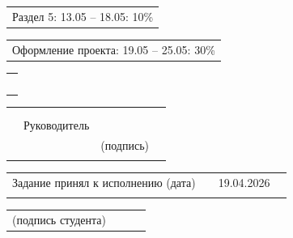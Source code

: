 \documentclass[12pt, А4, twoside]{article}
\begin{document}
\begin{FlushLeft}
    \vspace{-0.1 cm}
    
    \begin{tabular}{p{17.25cm}}
    	\hspace{0.3cm} \textsf{Раздел 5:} \hspace{2.54cm} \textsf{13.05 {--} 18.05:} \hspace{0.5cm} \textsf{10\%} \vspace{0pt} \hline
    \end{tabular}
    
    \vspace{-0.1 cm}
    
    \begin{tabular}{p{17.25cm}}
    	\hspace{0.3cm} \textsf{Оформление проекта:} \hspace{0.5cm} \textsf{19.05 {--} 25.05:} \hspace{0.5cm} \textsf{30\%} \vspace{0pt} \hline
    \end{tabular}

    \begin{tabular}{p{17.25cm}}
        \vspace{0pt} \hline \\
        \vspace{0pt} \hline \\
        \vspace{0pt} \hline \\
        \vspace{0pt} \hline \\
        \vspace{0pt} \hline \\
    \end{tabular}

    \begin{tabular}{p{4.2cm} p{3.8cm} p{6.0cm} p{2.0cm}}
        & & &
        \\
        & & &
        \\
        & \fontsize{14}{17.5} \textsf{Руководитель} &
        \vspace{0pt} \hline &
        \\
        & & \centering \fontsize{12}{15} \textsf{(подпись)} &
        \\
        & & &
    \end{tabular}

\fontsize{12}{15}

    \begin{tabular}{p{7.5cm} p{0.5cm} p{6.0cm} p{2.0cm}}
        \textsf{Задание принял к исполнению (дата)} & &
        \centering \textsf{19.04.2026} \vspace{1pt} \hline &
        \\
        & & &
    \end{tabular}

    \begin{tabular}{p{4.0cm} p{0.2cm} p{9.8cm} p{2.0cm}} 
        \textsf{(подпись студента)} & &
        \vspace{0pt} \hline &
        \\ 
    \end{tabular}

\end{FlushLeft}
\end{document}
